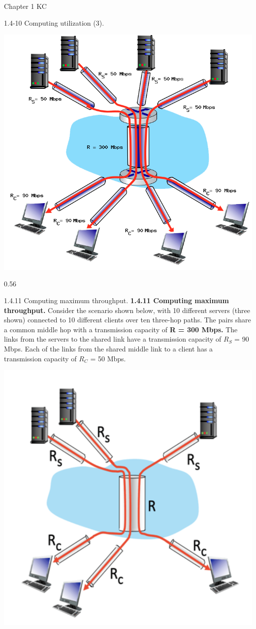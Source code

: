 \documentclass[a4paper]{article}
\begin{document}
\begin{quiz}{Chapter 1 KC}
\begin{shortanswer}[points=1,shuffle=true]{1.4-10 Computing utilization (3).}
\begin{center}
\includegraphics[width=.7\linewidth]{figs/1.4.7.png}
\end{center}
\item 0.56
\end{shortanswer}

\begin{multi}[points=1,shuffle=true]{1.4.11 Computing maximum throughput.}
\textbf{1.4.11 Computing maximum throughput.} 
Consider the scenario shown below, with 10 different servers (three shown) connected to 10 different clients over ten three-hop paths. The pairs share a common middle hop with a transmission capacity of \textbf{R = 300 Mbps.} The links from the servers to the shared link have a transmission capacity of $R_S$ = 90 Mbps. Each of the links from the shared middle link to a client has a transmission capacity of $R_C$ = 50 Mbps.
\begin{center}
\includegraphics[width=.7\linewidth]{figs/1.4.11.png}
\end{center}


\end{multi}
\end{quiz}
\end{document}
